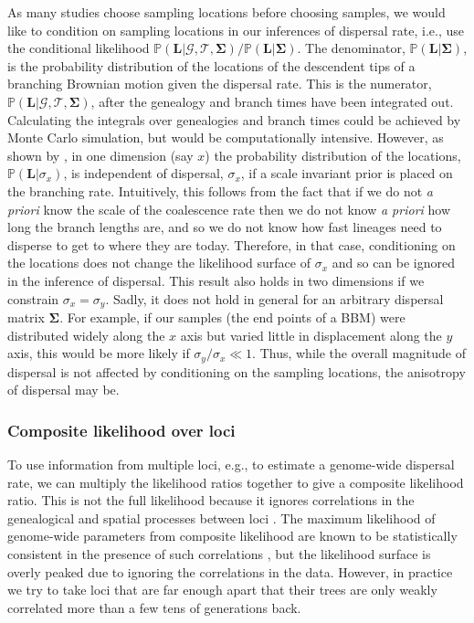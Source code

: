 \documentclass[12pt]{article}
\begin{document}
As many studies choose sampling locations before choosing samples, we would like to condition on sampling locations in our inferences of dispersal rate, i.e., use the conditional likelihood $\mathbb{P}(\mathbf{L} | \mathcal{G},\mathcal{T}, \mathbf{\Sigma})/\mathbb{P}(\mathbf{L} | \mathbf{\Sigma})$.
The denominator, $\mathbb{P}(\mathbf{L} | \mathbf{\Sigma})$, is the probability distribution of the locations of the descendent tips of a branching Brownian motion given the dispersal rate.
This is the numerator, $\mathbb{P}(\mathbf{L} | \mathcal{G},\mathcal{T}, \mathbf{\Sigma})$, after the genealogy and branch times have been integrated out. 
Calculating the integrals over genealogies and branch times could be achieved by Monte Carlo simulation, but would be computationally intensive. 
However, as shown by \citep{meligkotsidou2007postprocessing}, in one dimension (say $x$) the probability distribution of the locations, $\mathbb{P}(\mathbf{L} | \sigma_x)$, is independent of dispersal, $\sigma_x$, if a scale invariant prior is placed on the branching rate. 
Intuitively, this follows from the fact that if we do not {\it a priori} know the scale of the coalescence rate then we do not know {\it a priori} how long the branch lengths are, and so we do not know how fast lineages need to disperse to get to where they are today. 
Therefore, in that case, conditioning on the locations does not change the likelihood surface of $\sigma_x$ and so can be ignored in the inference of dispersal. 
This result also holds in two dimensions if we constrain $\sigma_x=\sigma_y$. 
Sadly, it does not hold in general for an arbitrary dispersal matrix $\mathbf{\Sigma}$. 
For example, if our samples (the end points of a BBM) were distributed widely along the $x$ axis but varied little in displacement along the $y$ axis, this would be more likely if $\sigma_y/\sigma_x \ll 1$. 
Thus, while the overall magnitude of dispersal is not affected by conditioning on the sampling locations, the anisotropy of dispersal may be.  

\subsubsection*{Composite likelihood over loci}

To use information from multiple loci, e.g., to estimate a genome-wide dispersal rate, we can multiply the likelihood ratios together to give a composite likelihood ratio.
This is not the full likelihood because it ignores correlations in the genealogical and spatial processes between loci \citep{hudson2001two,larribe2011composite,varin2011overview}. 
The maximum likelihood of genome-wide parameters from composite likelihood are known to be statistically consistent in the presence of such correlations \citep{wiuf2006consistency}, but the likelihood surface is overly peaked due to ignoring the correlations in the data. 
However, in practice we try to take loci that are far enough apart that their trees are only weakly correlated more than a few tens of generations back.
\end{document}
